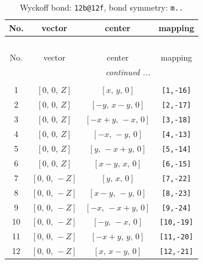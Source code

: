 \documentclass[fleqn,8pt]{jsarticle}
\begin{document}
\begin{longtable}{cccc}
\caption{Wyckoff bond: {\tt 12b@12f}, bond symmetry: {\tt m..}}
 \\
 \hline \hline
No. & vector & center & mapping \\ \hline \endfirsthead

\multicolumn{3}{l}{\tablename\ \thetable{}} \\
 \hline \hline
No. & vector & center & mapping \\ \hline \endhead

 \hline \hline
\multicolumn{3}{r}{\footnotesize\it continued ...} \\ \endfoot

 \hline \hline
\multicolumn{3}{r}{} \\ \endlastfoot

1 & $\left[ 0,\, 0,\, Z \right]$ & $\left[ x,\, y,\, 0 \right]$ & {\tt [1,-16]} \\ \hline
2 & $\left[ 0,\, 0,\, Z \right]$ & $\left[ - y,\, x - y,\, 0 \right]$ & {\tt [2,-17]} \\ \hline
3 & $\left[ 0,\, 0,\, Z \right]$ & $\left[ - x + y,\, - x,\, 0 \right]$ & {\tt [3,-18]} \\ \hline
4 & $\left[ 0,\, 0,\, Z \right]$ & $\left[ - x,\, - y,\, 0 \right]$ & {\tt [4,-13]} \\ \hline
5 & $\left[ 0,\, 0,\, Z \right]$ & $\left[ y,\, - x + y,\, 0 \right]$ & {\tt [5,-14]} \\ \hline
6 & $\left[ 0,\, 0,\, Z \right]$ & $\left[ x - y,\, x,\, 0 \right]$ & {\tt [6,-15]} \\ \hline
7 & $\left[ 0,\, 0,\, - Z \right]$ & $\left[ y,\, x,\, 0 \right]$ & {\tt [7,-22]} \\ \hline
8 & $\left[ 0,\, 0,\, - Z \right]$ & $\left[ x - y,\, - y,\, 0 \right]$ & {\tt [8,-23]} \\ \hline
9 & $\left[ 0,\, 0,\, - Z \right]$ & $\left[ - x,\, - x + y,\, 0 \right]$ & {\tt [9,-24]} \\ \hline
10 & $\left[ 0,\, 0,\, - Z \right]$ & $\left[ - y,\, - x,\, 0 \right]$ & {\tt [10,-19]} \\ \hline
11 & $\left[ 0,\, 0,\, - Z \right]$ & $\left[ - x + y,\, y,\, 0 \right]$ & {\tt [11,-20]} \\ \hline
12 & $\left[ 0,\, 0,\, - Z \right]$ & $\left[ x,\, x - y,\, 0 \right]$ & {\tt [12,-21]} \\
\end{longtable}
\renewcommand{\arraystretch}{1.2}
\end{document}
